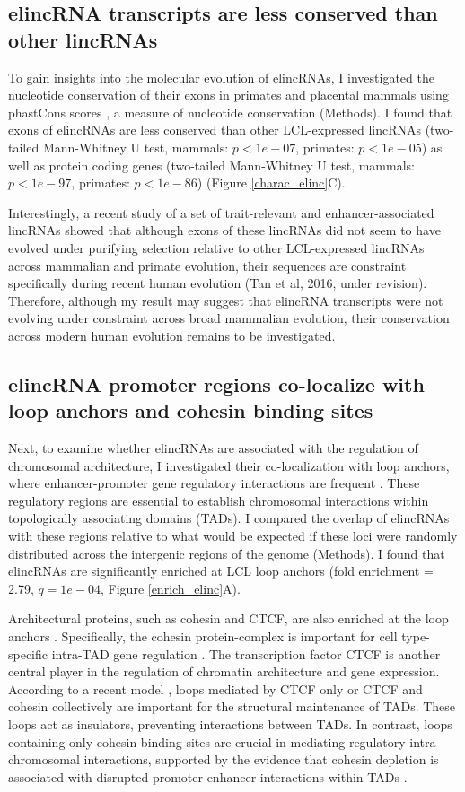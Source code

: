 \documentclass[11pt,a4paper]{report}
\begin{document}
\subsection*{elincRNA transcripts are less conserved than other lincRNAs}

To gain insights into the molecular evolution of elincRNAs, I investigated the nucleotide conservation of their exons in primates and placental mammals using phastCons scores \cite{Siepel2005}⁠, a measure of nucleotide conservation (Methods). I found that exons of elincRNAs are less conserved than other LCL-expressed lincRNAs (two-tailed Mann-Whitney U test, mammals: $p<1e-07$, primates: $p<1e-05$) as well as  protein coding genes (two-tailed Mann-Whitney U test, mammals: $p<1e-97$, primates: $p<1e-86$) (Figure \ref{charac_elinc}C). 

Interestingly, a recent study of a set of trait-relevant and enhancer-associated lincRNAs showed that although exons of these lincRNAs did not seem to have evolved under purifying selection relative to other LCL-expressed lincRNAs across mammalian and primate evolution, their sequences are constraint specifically during recent human evolution (Tan et al, 2016, under revision). Therefore, although my result may suggest that elincRNA transcripts were not evolving under constraint across broad mammalian evolution, their conservation across modern human evolution remains to be investigated.

\subsection*{elincRNA promoter regions co-localize with loop anchors and cohesin binding sites}

Next, to examine whether elincRNAs are associated with the regulation of chromosomal architecture, I investigated their co-localization with loop anchors, where enhancer-promoter gene regulatory interactions are frequent \cite{Ji2016}. These regulatory regions are essential to establish chromosomal interactions within topologically associating domains (TADs). I compared the overlap of elincRNAs with these regions relative to what would be expected if these loci were randomly distributed across the intergenic regions of the genome (Methods). I found that elincRNAs are significantly enriched at LCL loop anchors (fold enrichment = 2.79, $q=1e-04$, Figure \ref{enrich_elinc}A).


Architectural proteins, such as cohesin and CTCF, are also enriched at the loop anchors \cite{Rao2014}⁠. Specifically, the cohesin protein-complex is important for cell type-specific intra-TAD gene regulation \cite{Hadjur2009}⁠. The transcription factor CTCF is another central player in the regulation of chromatin architecture and gene expression. According to a recent model \cite{Ji2016}⁠, loops mediated by CTCF only or CTCF and cohesin collectively are important for the structural maintenance of TADs. These loops act as insulators, preventing interactions between TADs. In contrast, loops containing only cohesin binding sites are crucial in mediating regulatory intra-chromosomal interactions, supported by the evidence that cohesin depletion is associated with disrupted promoter-enhancer interactions within TADs \cite{Seitan2013}⁠.
\end{document}
